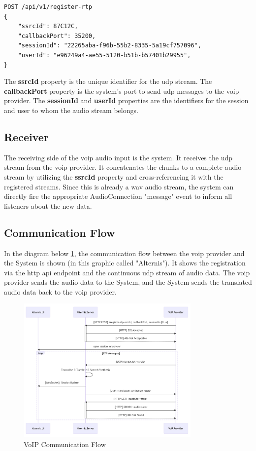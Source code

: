 \begin{verbatim}
POST /api/v1/register-rtp
{
    "ssrcId": 87C12C,
    "callbackPort": 35200,
    "sessionId": "22265aba-f96b-55b2-8335-5a19cf757096",
    "userId": "e96249a4-ae55-5120-b51b-b57401b29955",
}
\end{verbatim}

The \textbf{ssrcId} property is the unique identifier for the \ac{udp} stream. The \textbf{callbackPort} property is 
the system's port to send \ac{udp} messages to the \ac{voip} provider. The \textbf{sessionId} and \textbf{userId} 
properties are the identifiers for the session and user to whom the audio stream belongs.

\subsection{Receiver}

The receiving side of the \ac{voip} audio input is the system. It receives the \ac{udp} stream from the \ac{voip} 
provider. It concatenates the chunks to a complete audio stream by utilizing the \textbf{ssrcId} property and 
cross-referencing it with the registered streams. Since this is already a \ac{wav} audio stream, the system can directly 
fire the appropriate AudioConnection "message" event to inform all listeners about the new data.

\subsection{Communication Flow}

In the diagram below \ref{fig:voip-communication-flow}, the communication flow between the \ac{voip} provider and the 
System is shown (in this graphic called "Alternis"). It shows the registration via the \ac{http} \ac{api} endpoint and 
the continuous \ac{udp} stream of audio data. The \ac{voip} provider sends the audio data to the System, and the System 
sends the translated audio data back to the \ac{voip} provider. 

\begin{figure}[ht]
	\centering
	\includegraphics[width=0.8\textwidth]{Figures/voip-communication-flow.png}
	\caption{VoIP Communication Flow}
	\label{fig:voip-communication-flow}
\end{figure}
